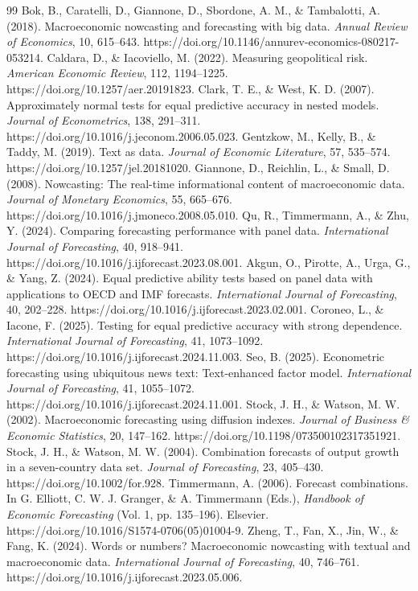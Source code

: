 \documentclass[preprint,12pt,authoryear]{elsarticle}
\begin{document}
\begin{thebibliography}{99}
 Bok, B., Caratelli, D., Giannone, D., Sbordone, A. M., \& Tambalotti, A. (2018). Macroeconomic nowcasting and forecasting with big data. \emph{Annual Review of Economics}, 10, 615--643. https://doi.org/10.1146/annurev-economics-080217-053214.
 Caldara, D., \& Iacoviello, M. (2022). Measuring geopolitical risk. \emph{American Economic Review}, 112, 1194--1225. https://doi.org/10.1257/aer.20191823.
 Clark, T. E., \& West, K. D. (2007). Approximately normal tests for equal predictive accuracy in nested models. \emph{Journal of Econometrics}, 138, 291--311. https://doi.org/10.1016/j.jeconom.2006.05.023.
 Gentzkow, M., Kelly, B., \& Taddy, M. (2019). Text as data. \emph{Journal of Economic Literature}, 57, 535--574. https://doi.org/10.1257/jel.20181020.
 Giannone, D., Reichlin, L., \& Small, D. (2008). Nowcasting: The real-time informational content of macroeconomic data. \emph{Journal of Monetary Economics}, 55, 665--676. https://doi.org/10.1016/j.jmoneco.2008.05.010.
 Qu, R., Timmermann, A., \& Zhu, Y. (2024). Comparing forecasting performance with panel data. \emph{International Journal of Forecasting}, 40, 918--941. https://doi.org/10.1016/j.ijforecast.2023.08.001.
 Akgun, O., Pirotte, A., Urga, G., \& Yang, Z. (2024). Equal predictive ability tests based on panel data with applications to OECD and IMF forecasts. \emph{International Journal of Forecasting}, 40, 202--228. https://doi.org/10.1016/j.ijforecast.2023.02.001.
 Coroneo, L., \& Iacone, F. (2025). Testing for equal predictive accuracy with strong dependence. \emph{International Journal of Forecasting}, 41, 1073--1092. https://doi.org/10.1016/j.ijforecast.2024.11.003.
 Seo, B. (2025). Econometric forecasting using ubiquitous news text: Text-enhanced factor model. \emph{International Journal of Forecasting}, 41, 1055--1072. https://doi.org/10.1016/j.ijforecast.2024.11.001.
 Stock, J. H., \& Watson, M. W. (2002). Macroeconomic forecasting using diffusion indexes. \emph{Journal of Business \& Economic Statistics}, 20, 147--162. https://doi.org/10.1198/073500102317351921.
 Stock, J. H., \& Watson, M. W. (2004). Combination forecasts of output growth in a seven-country data set. \emph{Journal of Forecasting}, 23, 405--430. https://doi.org/10.1002/for.928.
 Timmermann, A. (2006). Forecast combinations. In G. Elliott, C. W. J. Granger, \& A. Timmermann (Eds.), \emph{Handbook of Economic Forecasting} (Vol. 1, pp. 135--196). Elsevier. https://doi.org/10.1016/S1574-0706(05)01004-9.
 Zheng, T., Fan, X., Jin, W., \& Fang, K. (2024). Words or numbers? Macroeconomic nowcasting with textual and macroeconomic data. \emph{International Journal of Forecasting}, 40, 746--761. https://doi.org/10.1016/j.ijforecast.2023.05.006.
\end{thebibliography}
\end{document}
